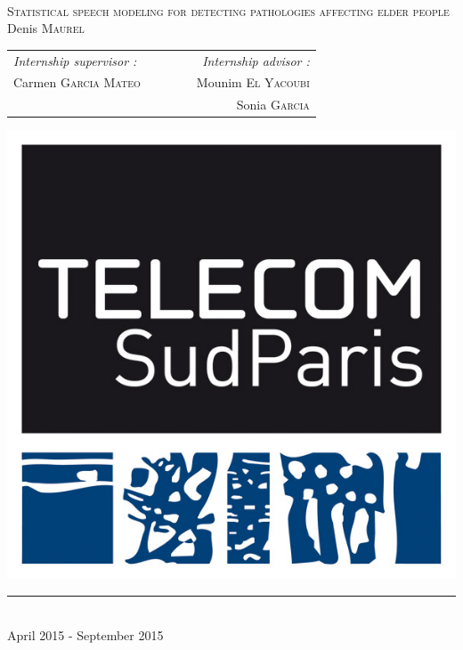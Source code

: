 \documentclass{report}
\begin{document}
	\begin{titlepage}
		~ \\ [1cm]
		\begin{center}
			\textsc{\fontsize{15pt}{5}\selectfont Statistical speech modeling for detecting pathologies affecting elder people}
			\\[1.5cm]
			Denis \textsc{Maurel}
			\\[1.5cm]
			\begin{tabular}{lcr}
				\emph{Internship supervisor :} & ~~~~~ & \emph{Internship advisor :}\\ 
				Carmen \textsc{Garcia Mateo} & ~~~~~ & Mounim \textsc{El Yacoubi} \\
				~ & ~~~~~ & Sonia \textsc{Garcia}
			\end{tabular}
			
		\end{center}
		
		\vfill
		
		\begin{center}
			\includegraphics[scale=0.3]{ressources/tsp.jpg}
			\\[0.5cm]
			\rule{\textwidth}{0.2mm}
			\\[1cm]
			April 2015 - September 2015
		\end{center}
		
	\end{titlepage}
	
\end{document}
